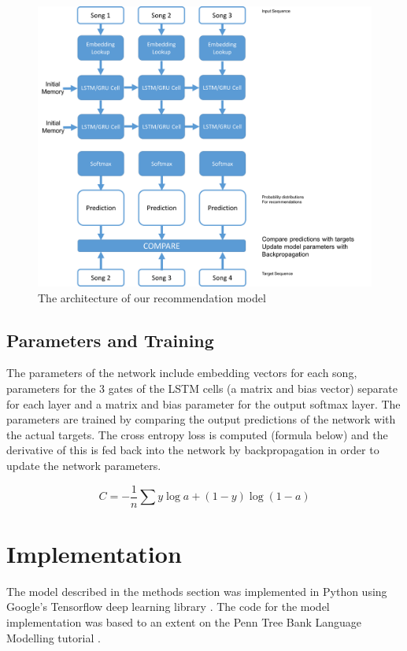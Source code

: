 \documentclass{article} %
\begin{document}
\begin{figure}
	\label{architecture}
	\begin{center}
		\includegraphics[scale = 0.3]{"../images/architecture"}
		\caption{The architecture of our recommendation model}
	\end{center}
\end{figure}


\subsection{Parameters and Training}
The parameters of the network include embedding vectors for each song, parameters for the 3 gates of the LSTM cells (a matrix and bias vector) separate for each layer and a matrix and bias parameter for the output softmax layer. The parameters are trained by comparing the output predictions of the network with the actual targets. The cross entropy loss is computed (formula below) and the derivative of this is fed back into the network by backpropagation in order to update the network parameters. \cite{NN_deeplearning}

\begin{equation}
C = -\frac{1}{n} \sum y \log a + (1 - y) \log(1-a)
\end{equation}

\section{Implementation}
The model described in the methods section was implemented in Python using Google's Tensorflow deep learning library \cite{tensorflow}. The code for the model implementation was based to an extent on the Penn Tree Bank Language Modelling tutorial \cite{tensorflow-ptb}. 
\end{document}
